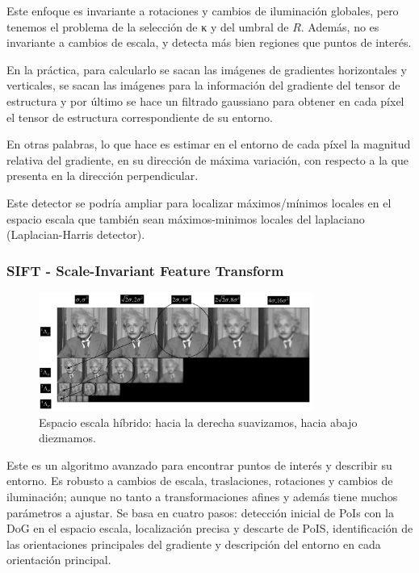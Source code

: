 \documentclass[nochap,palatino]{apuntes}
\begin{document}
Este enfoque es invariante a rotaciones y cambios de iluminación globales, pero tenemos el problema de la selección de κ y del umbral de $R$. Además, no es invariante a cambios de escala, y detecta más bien regiones que puntos de interés.

En la práctica, para calcularlo se sacan las imágenes de gradientes horizontales y verticales, se sacan las imágenes para la información del gradiente del tensor de estructura y por último se hace un filtrado gaussiano para obtener en cada píxel el tensor de estructura correspondiente de su entorno.

En otras palabras, lo que hace es estimar en el entorno de cada píxel la magnitud relativa del gradiente, en su dirección de máxima variación, con respecto a la que presenta en la dirección perpendicular.

Este detector se podría ampliar para localizar máximos/mínimos locales en el espacio escala que también sean máximos-minimos locales del laplaciano (Laplacian-Harris detector).

\subsubsection{SIFT - Scale-Invariant Feature Transform}

\begin{figure}[hbtp]
\centering
\includegraphics[width=0.8\textwidth]{img/SIFT.png}
\caption{Espacio escala híbrido: hacia la derecha suavizamos, hacia abajo diezmamos.}
\label{fig:SIFTScaleSpace}
\end{figure}

Este es un algoritmo avanzado para encontrar puntos de interés y describir su entorno. Es robusto a cambios de escala, traslaciones, rotaciones y cambios de iluminación; aunque no tanto a transformaciones afines y además tiene muchos parámetros a ajustar. Se basa en cuatro pasos: detección inicial de PoIs con la DoG en el espacio escala, localización precisa y descarte de PoIS, identificación de las orientaciones principales del gradiente y descripción del entorno en cada orientación principal.
\end{document}
